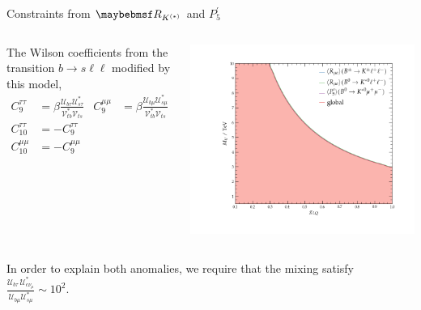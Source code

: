 \documentclass[9pt,usenames,dvipsnames]{beamer}
\begin{document}
\begin{frame}{Constraints from $\RK$ and $P^\prime _5$}
	\begin{columns}[c]
		The Wilson coefficients from the transition $ b\to s \ell \ell$ modified by this model,
		\begin{align*}
		C^{\tau\tau}_{9} &= \beta \frac{\mathcal U_{b\tau} \mathcal U^*_{s\tau}}{\mathcal{V}^*_{tb}\mathcal{V}_{ts}} & C^{\mu\mu}_{9} &= \beta \frac{\mathcal U_{b\mu} \mathcal U^*_{s\mu}}{\mathcal{V}^*_{tb}\mathcal{V}_{ts}}  \\
		C^{\tau\tau}_{10} &=   -C^{\tau\tau}_{9} \\C^{\mu \mu}_{10} &=   -C^{\mu \mu}_{9} 
		\end{align*}
				\begin{center}
					\includegraphics[width= 1.1\textwidth]{./assets/fit_bsmumu} 
				\end{center}
	\end{columns}
	In order to explain both anomalies, we require that the mixing satisfy~ $\frac{\mathcal U_{b\tau}\,\mathcal U^*_{c \nu_\mu}  }{\mathcal U_{b\mu} \mathcal U^*_{s\mu}}\sim 10^{2}$.
\end{frame}
\end{document}
